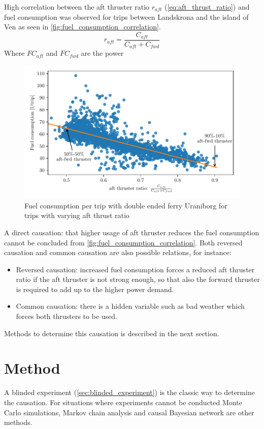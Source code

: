 \documentclass[fleqn,10pt]{olplainarticle}
\begin{document}
\newpage 
\noindent High correlation between the aft thruster ratio $r_{aft}$ (\autoref{eq:aft_thrust_ratio}) and fuel consumption 
was observed for trips between Landskrona and the island of Ven as seen in \autoref{fig:fuel_consumption_correlation}.
\begin{equation}
    r_{aft} = \frac{C_{aft}}{C_{aft} + C_{fwd}}
    \label{eq:aft_thrust_ratio}
\end{equation}
Where $FC_{aft}$ and $FC_{fwd}$ are the power

\begin{figure}[!htb]
    \centering
    \includegraphics[width=\textwidth]{figures/correlation.pdf}
    \caption{Fuel consumption per trip with double ended ferry Uraniborg for trips with varying aft thrust ratio}
    \label{fig:fuel_consumption_correlation}
\end{figure}
A direct causation: that higher usage of aft thruster reduces the fuel consumption cannot be concluded from \autoref{fig:fuel_consumption_correlation}. Both reversed causation and common causation are also possible relations, for instance:
\begin{itemize}
    \item Reversed causation: increased fuel consumption forces a reduced aft thruster ratio if the aft thruster is not strong enough, so that also the forward thruster is required to add up to the higher power demand.
    
    \item Common causation: there is a hidden variable such as bad weather which forces both thrusters to be used.
\end{itemize}
Methods to determine this causation is described in the next section. 

\section{Method}
A blinded experiment (\autoref{sec:blinded_experiment}) is the classic way to determine the causation. For situations where experiments cannot be conducted Monte Carlo simulations, Markov chain analysis and causal Bayesian network are other methods.
\end{document}
